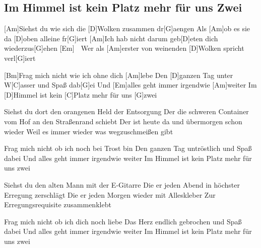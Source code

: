 \subsection*{Im Himmel ist kein Platz mehr für uns Zwei   }
\begin{guitar}

[Am]Siehst du wie sich die [D]Wolken zusammen dr[G]aengen
Als [Am]ob es sie da [D]oben alleine fr[G]iert
[Am]Ich hab nicht darum geb[D]eten dich wiederzus[G]ehen [Em] $\;$ 
Wer als [Am]erster von weinenden [D]Wolken spricht verl[G]iert

[Bm]Frag mich nicht wie ich ohne dich [Am]lebe
Den [D]ganzen Tag unter W[C]asser und Spaß dab[G]ei
Und [Em]alles geht immer irgendwie [Am]weiter
Im [D]Himmel ist kein [C]Platz mehr für uns [G]zwei



Siehst du dort den orangenen Held der Entsorgung
Der die schweren Container vom Hof an den Straßenrand schiebt
Der ist heute da und übermorgen schon wieder
Weil es immer wieder was wegzuschmeißen gibt

Frag mich nicht ob ich noch bei Trost bin
Den ganzen Tag untröstlich und Spaß dabei
Und alles geht immer irgendwie weiter
Im Himmel ist kein Platz mehr für uns zwei


Siehst du den alten Mann mit der E-Gitarre
Die er jeden Abend in höchster Erregung zerschlägt
Die er jeden Morgen wieder mit Alleskleber
Zur Erregungsrequisite zusammenklebt

Frag mich nicht ob ich dich noch liebe
Das Herz endlich gebrochen und Spaß dabei
Und alles geht immer irgendwie weiter
Im Himmel ist kein Platz mehr für uns zwei
\end{guitar}

